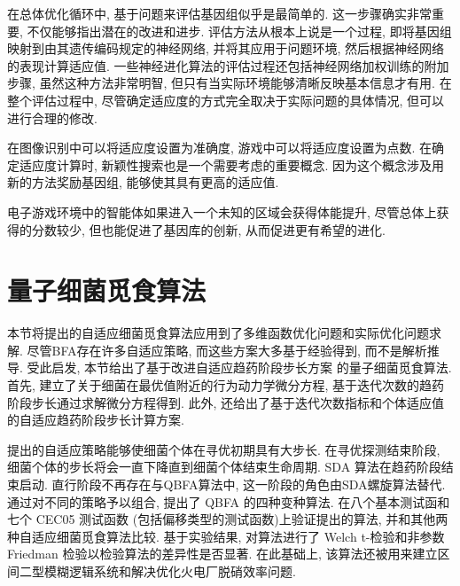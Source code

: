 在总体优化循环中, 基于问题来评估基因组似乎是最简单的.
这一步骤确实非常重要, 不仅能够指出潜在的改进和进步.
评估方法从根本上说是一个过程, 即将基因组映射到由其遗传编码规定的神经网络, 并将其应用于问题环境, 然后根据神经网络的表现计算适应值.
一些神经进化算法的评估过程还包括神经网络加权训练的附加步骤, 虽然这种方法非常明智, 但只有当实际环境能够清晰反映基本信息才有用.
在整个评估过程中, 尽管确定适应度的方式完全取决于实际问题的具体情况, 但可以进行合理的修改.
\begin{example}
    在图像识别中可以将适应度设置为准确度, 游戏中可以将适应度设置为点数.
    在确定适应度计算时, 新颖性搜索也是一个需要考虑的重要概念.
    因为这个概念涉及用新的方法奖励基因组, 能够使其具有更高的适应值.
\end{example}
\begin{example}
    电子游戏环境中的智能体如果进入一个未知的区域会获得体能提升, 尽管总体上获得的分数较少, 但也能促进了基因库的创新, 从而促进更有希望的进化.
\end{example}
\section{量子细菌觅食算法}
本节将提出的自适应细菌觅食算法应用到了多维函数优化问题和实际优化问题求解. 尽管BFA存在许多自适应策略, 而这些方案大多基于经验得到, 而不是解析推导.
受此启发, 本节给出了基于改进自适应趋药阶段步长方案 的量子细菌觅食算法.
首先, 建立了关于细菌在最优值附近的行为动力学微分方程, 基于迭代次数的趋药阶段步长通过求解微分方程得到.
此外, 还给出了基于迭代次数指标和个体适应值的自适应趋药阶段步长计算方案.

提出的自适应策略能够使细菌个体在寻优初期具有大步长. 在寻优探测结束阶段, 细菌个体的步长将会一直下降直到细菌个体结束生命周期.
SDA 算法在趋药阶段结束启动. 直行阶段不再存在与QBFA算法中, 这一阶段的角色由SDA螺旋算法替代.
通过对不同的策略予以组合, 提出了 QBFA 的四种变种算法.
在八个基本测试函和七个  CEC05 测试函数 (包括偏移类型的测试函数)上验证提出的算法, 并和其他两种自适应细菌觅食算法比较.
基于实验结果, 对算法进行了 Welch t-检验和非参数 Friedman 检验以检验算法的差异性是否显著.
在此基础上, 该算法还被用来建立区间二型模糊逻辑系统和解决优化火电厂脱硝效率问题.
